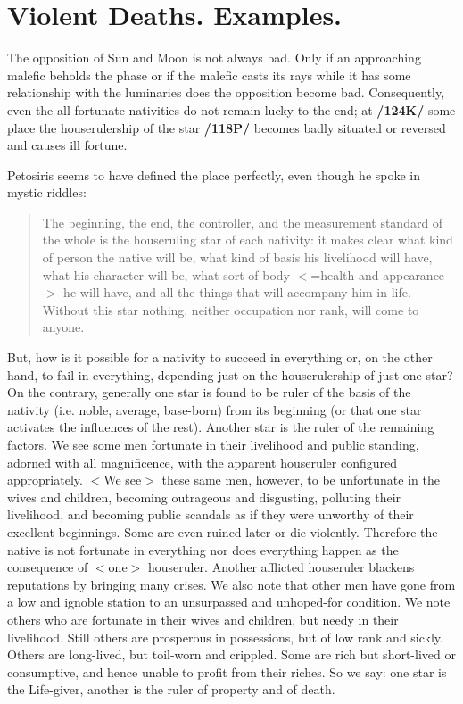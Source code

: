 \section{Violent Deaths. Examples.}

The opposition of Sun and Moon is not always bad. Only if an approaching malefic beholds the phase or if the malefic casts its rays while it has some relationship with the luminaries does the opposition become bad. Consequently, even the all-fortunate nativities do not remain lucky to the end; at \textbf{/124K/} some place the houserulership of the star \textbf{/118P/} becomes badly situated or reversed and causes ill fortune.

Petosiris seems to have defined the place perfectly, even though he spoke in mystic riddles: \begin{quote}The
beginning, the end, the controller, and the measurement standard of the whole is the houseruling star of
each nativity: it makes clear what kind of person the native will be, what kind of basis his livelihood will have, what his character will be, what sort of body $<$=health and appearance$>$ he will have, and all the things that will accompany him in life. Without this star nothing, neither occupation nor rank, will come to anyone.\end{quote}

But, how is it possible for a nativity to succeed in everything or, on the other hand, to fail in everything, depending just on the houserulership of just one star? On the contrary, generally one star is found to be ruler of the basis of the nativity (i.e. noble, average, base-born) from its beginning (or that one star activates the influences of the rest). Another star is the ruler of the remaining factors. We see some men fortunate in their livelihood and public standing, adorned with all magnificence, with the apparent houseruler configured appropriately. $<$We see$>$ these same men, however, to be unfortunate in the wives
and children, becoming outrageous and disgusting, polluting their livelihood, and becoming public scandals as if they were unworthy of their excellent beginnings. Some are even ruined later or die violently. Therefore the native is not fortunate in everything nor does everything happen as the consequence of $<$one$>$ houseruler. Another afflicted houseruler blackens reputations by bringing many crises. We also note that other men have gone from a low and ignoble station to an unsurpassed and unhoped-for condition. We note others who are fortunate in their wives and children, but needy in their livelihood. Still others are prosperous in possessions, but of low rank and sickly. Others are long-lived, but toil-worn and crippled. Some are rich but short-lived or consumptive, and hence unable to profit from their riches. So we say: one star is the Life-giver, another is the ruler of property and of death.

